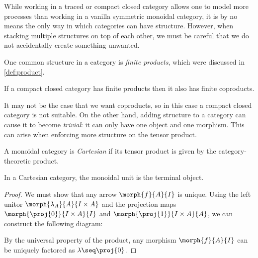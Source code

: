 While working in a traced or compact closed category allows one to model more
processes than working in a vanilla symmetric monoidal category, it is by no
means the only way in which categories can have structure.
However, when stacking multiple structures on top of each other, we must be
careful that we do not accidentally create something unwanted.

One common structure in a category is \emph{finite products}, which were
discussed in \cref{def:product}.

\begin{theorem}
    If a compact closed category has finite products then it also has finite
    coproducts.
\end{theorem}

It may not be the case that we want coproducts, so in this case a compact closed
category is not suitable.
On the other hand, adding structure to a category can cause it to become
\emph{trivial}: it can only have one object and one morphism.
This can arise when enforcing more structure on the tensor product.

\begin{definition}
    A monoidal category is \emph{Cartesian} if its tensor product is given by
    the category-theoretic product.
\end{definition}

\begin{lemma}
    In a Cartesian category, the monoidal unit is the terminal object.
\end{lemma}
\begin{proof}
    We must show that any arrow \(\morph{f}{A}{I}\) is unique.
    Using the left unitor \(\morph{\lambda_A}{A}{I \times A}\) and the
    projection maps \(\morph{\proj{0}}{I \times A}{I}\) and
    \(\morph{\proj{1}}{I \times A}{A}\), we can construct the following diagram:
    \begin{center}
        \vspace{0.5em}
    \end{center}
    By the universal property of the product, any morphism \(\morph{f}{A}{I}\)
    can be uniquely factored as \(\lambda \seq \proj{0}\).
\end{proof}

